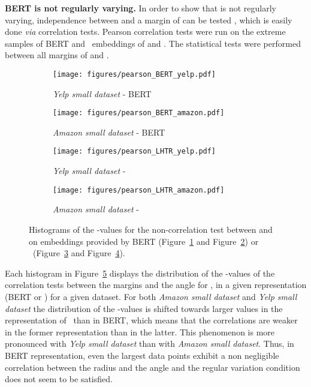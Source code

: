 \textbf{BERT is not regularly varying.}
In order to show that  is not regularly varying, independence between  and a margin of  can be tested   \cite{coles1994statistical}, which is easily  done \emph{via} correlation tests.  
Pearson correlation tests were run on the extreme samples  of BERT and \HTalgo\ embeddings of  and . The statistical tests were performed  between all margins of  and .  
\begin{figure}[H]
\centering
\begin{subfigure}[t]{0.45\textwidth}
    \texttt{[image: figures/pearson\_BERT\_yelp.pdf]}
    \caption{\textit{Yelp small dataset} - BERT}
    \label{fig:pearson_bert_yelp}
\end{subfigure}
\begin{subfigure}[t]{0.45\textwidth}
    \texttt{[image: figures/pearson\_BERT\_amazon.pdf]}
    \caption{\textit{Amazon small dataset} - BERT}
    \label{fig:pearson_bert_amazon}
\end{subfigure}

\begin{subfigure}[t]{0.45\textwidth}
    \texttt{[image: figures/pearson\_LHTR\_yelp.pdf]}
    \caption{\textit{Yelp small dataset} - \HTalgo}
    \label{fig:pearson_lhtr_yelp}
\end{subfigure}
\begin{subfigure}[t]{0.45\textwidth}
    \texttt{[image: figures/pearson\_LHTR\_amazon.pdf]}
    \caption{\textit{Amazon small dataset} - \HTalgo}
    \label{fig:pearson_lhtr_amazon}
\end{subfigure}
\caption{Histograms of the -values for the non-correlation test between  and  on embeddings provided by BERT (Figure~\ref{fig:pearson_bert_yelp} and Figure~\ref{fig:pearson_bert_amazon}) or \HTalgo\ (Figure~\ref{fig:pearson_lhtr_yelp} and Figure~\ref{fig:pearson_lhtr_amazon}).}
\label{fig:pearson}
\end{figure}
Each histogram in Figure~\ref{fig:pearson}  displays the distribution of the  -values of  the correlation tests between the margins   and the angle  for , in  a given representation (BERT or \HTalgo) for a given dataset. For both \textit{Amazon small dataset} and \textit{Yelp small dataset} the distribution of the -values is shifted towards larger values in the representation of \HTalgo\ than in BERT, which means that the correlations are weaker in the former representation than in the latter. This phenomenon is more pronounced with \textit{Yelp small dataset} than with \textit{Amazon small dataset}. Thus, in BERT representation, even the largest data points exhibit a non negligible correlation between the radius and the angle and the regular variation condition does not seem to be satisfied. 
